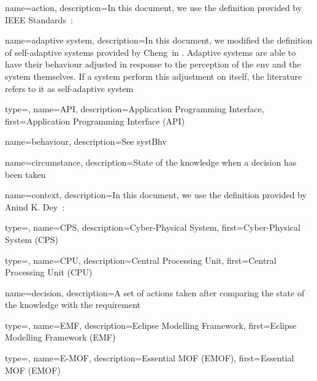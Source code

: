 {
	name={ac\-tion},
	description={In this document, we use the definition provided by IEEE Standards~\cite{iso2017systems}: }
}

{
	name={adaptive system},
	description={In this document, we modified the definition of self-adaptive systems provided by Cheng~\etal in \cite{DBLP:conf/dagstuhl/ChengLGIMABBBCSDFGGGKKKLMMMPSTTWW09}. Adaptive systems are able to have their \gls{behaviour} adjusted in response to the perception of the \gls{env} and the system themselves. If a system perform this adjustment on itself, the literature refers to it as self-adaptive system}
}

{
	type=\acronymtype,
	name={API},
	description={Application Programming Interface},
	first={Application Programming Interface (API)}
}

{
	name={be\-ha\-viour},
	description={See \gls{systBhv}}
}

{
	name={cir\-cums\-tance},
	description={State of the \gls{knowledge} when a \gls{decision} has been taken}
}

{
	name={con\-text},
	description={In this document, we use the definition provided by Anind K. Dey~\cite{DBLP:journals/puc/Dey01}: }
}

{
	type=\acronymtype,
	name={CPS},
	description={Cyber-Physical System},
	first={Cyber-Physical System (CPS)}
}

{
	type=\acronymtype,
	name={CPU},
	description={Central Processing Unit},
	first={Central Processing Unit (CPU)}
}

{
	name={de\-ci\-sion},
	description={A set of \glspl{action} taken after comparing the state of the \gls{knowledge} with the \gls{requirement}}
}

{
	type=\acronymtype,
	name={EMF},
	description={Eclipse Modelling Framework},
	first={Eclipse Modelling Framework (EMF)}
}

{
	type=\acronymtype,
	name={E-MOF},
	description={Essential MOF (EMOF)},
	first={Essential MOF (EMOF)}
}

